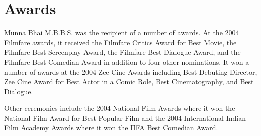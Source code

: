 \documentclass[]{article}
\begin{document}
\section{Awards}
Munna Bhai M.B.B.S. was the recipient of a number of awards. At the 2004 Filmfare awards, it received the Filmfare Critics Award for Best Movie, the Filmfare Best Screenplay Award, the Filmfare Best Dialogue Award, and the Filmfare Best Comedian Award in addition to four other nominations. It won a number of awards at the 2004 Zee Cine Awards including Best Debuting Director, Zee Cine Award for Best Actor in a Comic Role, Best Cinematography, and Best Dialogue.

Other ceremonies include the 2004 National Film Awards where it won the National Film Award for Best Popular Film and the 2004 International Indian Film Academy Awards where it won the IIFA Best Comedian Award.
\end{document}
